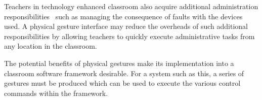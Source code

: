 \documentclass[manuscript, review, screen]{acmart}
\begin{document}
Teachers in technology enhanced classroom also acquire additional administration responsibilities~\cite{Kuhn2005} such as managing the consequence of faults with the devices used.
A physical gesture interface may reduce the overheads of such additional responsibilities by allowing teachers to quickly execute administrative tasks from any location in the classroom.

The potential benefits of physical gestures make its implementation into a classroom software framework desirable.
For a system such as this, a series of gestures must be produced which can be used to execute the various control commands within the framework.


\end{document}
